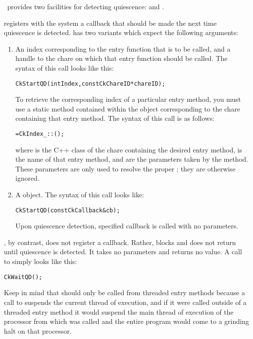 \charmpp\ provides two facilities for detecting quiescence:  and
.

 registers with the system a callback that should be made the
next time quiescence is detected.   has two
variants which expect the following arguments: 
\begin{enumerate}
\item An index corresponding to the entry function that is to be called,
and a handle to the chare on which that entry function should be called.  The
syntax of this call looks like this:

\begin{alltt}
 CkStartQD(int Index,const CkChareID* chareID);
\end{alltt}

To retrieve the corresponding index of a particular entry
method, you must use a static method contained within the  object
corresponding to the chare containing that entry method.  The
syntax of this call is as follows:

\begin{alltt}
=CkIndex_::();
\end{alltt}

where  is the C++ class of the chare containing
the desired entry method,  is the name of that entry method,
and  are the parameters taken by the method.
These parameters are only used to resolve the proper ;
they are otherwise ignored.

\item 
A  object. The syntax of this call looks like:
\begin{alltt}
  CkStartQD(const CkCallback& cb);
\end{alltt}

Upon quiescence detection, specified callback is called with no parameters.

\end{enumerate}


, by contrast, does not register a callback.  Rather,
 blocks and does not return until quiescence is
detected.  It takes no parameters and returns no value.  A call to
 simply looks like this: 

\begin{alltt}
  CkWaitQD();
\end{alltt}

Keep in mind that  should only be called from threaded
entry methods because a call to  suspends the
current thread of execution, and if it were called outside of a threaded entry
method it would suspend the main thread of execution of the processor from
which  was called and the entire program would come to a grinding
halt on that processor.


